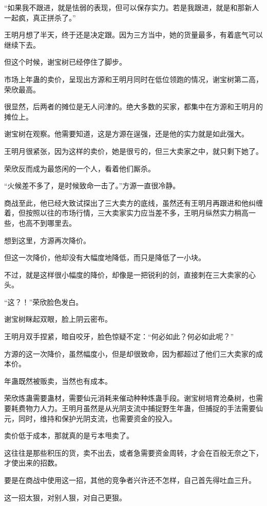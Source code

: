 \begin{this_body}
“如果我不跟进，就是怯弱的表现，但可以保存实力。若是我跟进，就是和那新人一起疯，真正拼杀了。”

王明月想了半天，终于还是决定跟。因为三方当中，她的货量最多，有着底气可以继续下去。

但这个时候，谢宝树已经停住了脚步。

市场上年蛊的卖价，呈现出方源和王明月同时在低位领跑的情况，谢宝树第二高，荣欣最高。

很显然，后两者的摊位是无人问津的。绝大多数的买家，都集中在方源和王明月的摊位上。

谢宝树在观察。他需要知道，这是方源在逞强，还是他的实力就是如此强大。

王明月很紧张，因为这样的卖价，她是很亏的，但三大卖家之中，就只剩下她了。

荣欣反而成为最悠闲的一个人，看着他们厮杀。

“火候差不多了，是时候致命一击了。”方源一直很冷静。

商战至此，他已经大致试探出了三大卖方的底线，虽然还有王明月再跟进和他纠缠着，但按照以往的市场行情，三大卖家实力应当差不多，王明月纵然实力稍高一些，也高不到哪里去。

想到这里，方源再次降价。

但这一次降价，他却没有大幅度地降低，而只是降低了一小块。

不过，就是这样很小幅度的降价，却像是一把锐利的剑，直接刺在三大卖家的心头。

“这？！”荣欣脸色发白。

谢宝树眯起双眼，脸上阴云密布。

王明月双手捏紧，暗自咬牙，脸色惊疑不定：“何必如此？何必如此呢？”

方源的这一次降价，虽然幅度小，但是却很致命，因为都超过了他们三大卖家的成本价。

年蛊既然被贩卖，当然也有成本。

荣欣炼蛊需要蛊材，需要仙元消耗来催动种种炼蛊手段。谢宝树培育沧桑树，也需要耗费物力人力。王明月虽然是从光阴支流中捕捉野生年蛊，但捕捉的手法需要仙元，同时，维持和保护光阴支流，也需要资金的投入。

卖价低于成本，那就真的是亏本甩卖了。

这往往是那些积压的货，卖不出去，或者急需要资金周转，才会在百般无奈之下，才使出来的招数。

要是在商战中使用这一招，其他的竞争者兴许还不怎样，自己首先得吐血三升。

这一招太狠，对别人狠，对自己更狠。


\end{this_body}

